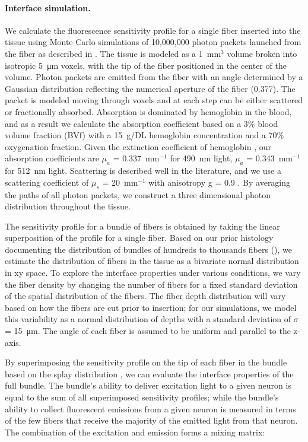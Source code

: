 \paragraph{Interface simulation.} We calculate the fluorescence sensitivity profile for a single fiber inserted into the tissue using Monte Carlo simulations of 10,000,000 photon packets launched from the fiber as described in \cite{Boas:2002ue}. The tissue is modeled as a 1~mm$^3$ volume broken into isotropic 5~\si{\micro\meter} voxels, with the tip of the fiber positioned in the center of the volume. Photon packets are emitted from the fiber with an angle determined by a Gaussian distribution reflecting the numerical aperture of the fiber (0.377). The packet is modeled moving through voxels and at each step can be either scattered or fractionally absorbed. Absorption is dominated by hemoglobin in the blood, and as a result we calculate the absorption coefficient based on a 3\% blood volume fraction (BVf) \cite{S:2010hi} with a 15~g/DL hemoglobin concentration \cite{Raabe:2011uo} and a 70\% oxygenation fraction. Given the extinction coefficient of hemoglobin \cite{kollias1999tabulated}, our absorption coefficients are $\mu_a$ = 0.337~mm$^{-1}$ for 490~nm light, $\mu_a$ = 0.343~mm$^{-1}$ for 512~nm light. Scattering is described well in the literature, and we use a scattering coefficient of $\mu_s$ = 20~mm$^{-1}$ with anisotropy g = 0.9 \cite{AlJuboori:2013cj,Yi:2012wp}. By averaging the paths of all photon packets, we construct a three dimensional photon distribution throughout the tissue.

The sensitivity profile for a bundle of fibers is obtained by taking the linear superposition of the profile for a single fiber. Based on our prior histology documenting the distribution of bundles of hundreds to thousands fibers (), we estimate the distribution of fibers in the tissue as a bivariate normal distribution in xy space. To explore the interface properties under various conditions, we vary the fiber density by changing the number of fibers for a fixed standard deviation of the spatial distribution of the fibers. The fiber depth distribution will vary based on how the fibers are cut prior to insertion; for our simulations, we model this variability as a normal distribution of depths with a standard deviation of $\sigma$ = 15~\si{\micro\meter}. The angle of each fiber is assumed to be uniform and parallel to the z-axis.

By superimposing the sensitivity profile on the tip of each fiber in the bundle based on the splay distribution \cite{Hillman:2004wca,Burgess:2008uu}, we can evaluate the interface properties of the full bundle. The bundle's ability to deliver excitation light to a given neuron is equal to the sum of all superimposed sensitivity profiles; while the bundle's ability to collect fluorescent emissions from a given neuron is measured in terms of the few fibers that receive the majority of the emitted light from that neuron. The combination of the excitation and emission forms a mixing matrix:

